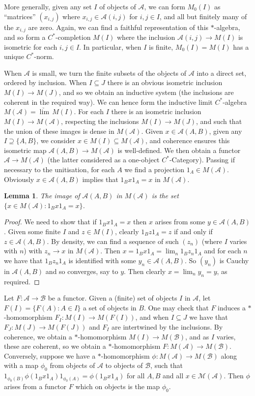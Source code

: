 \documentclass[a4paper,11pt]{article}
\theoremstyle{plain}
\newtheorem{lemma}[proposition]{Lemma}
\theoremstyle{remark}
\newcommand{\mc}[1]{\mathcal{#1}}
\begin{document}
More generally, given any set $I$ of objects of $\mc A$, we can form $M_0(I)$ as ``matrices'' $(x_{i,j})$ where $x_{i,j} \in \mc A(i,j)$ for $i,j\in I$, and all but finitely many of the $x_{i,j}$ are zero.  Again, we can find a faithful representation of this $*$-algebra, and so form a $C^*$-completion $M(I)$ where the inclusion $\mc A(i,j) \to M(I)$ is isometric for each $i,j\in I$.  In particular, when $I$ is finite, $M_0(I) = M(I)$ has a unique $C^*$-norm.

When $\mc A$ is small, we turn the finite subsets of the objects of $\mc A$ into a direct set, ordered by inclusion.  When $I\subseteq J$ there is an obvious isometric inclusion $M(I) \to M(J)$, and so we obtain an inductive system (the inclusions are coherent in the required way).  We can hence form the inductive limit $C^*$-algebra $M(\mc A) = \underrightarrow{\lim}\, M(I)$.  For each $I$ there is an isometric inclusion $M(I) \to M(\mc A)$, respecting the inclusions $M(I)\to M(J)$, and such that the union of these images is dense in $M(\mc A)$.  Given $x\in \mc A(A,B)$, given any $I \supseteq \{A,B\}$, we consider $x\in M(I) \subseteq M(\mc A)$, and coherence ensures this isometric map $\mc A(A,B) \to M(\mc A)$ is well-defined.  We then obtain a functor $\mc A \to M(\mc A)$ (the latter considered as a one-object $C^*$-Category).  Passing if necessary to the unitisation, for each $A$ we find a projection $1_A \in M(\mc A)$.  Obviously $x\in\mc A(A,B)$ implies that $1_B x 1_A = x$ in $M(\mc A)$.

\begin{lemma}
The image of $\mc A(A,B)$ in $M(\mc A)$ is the set $\{ x\in M(\mc A) : 1_B x 1_A = x \}$.
\end{lemma}
\begin{proof}
We need to show that if $1_B x 1_A = x$ then $x$ arises from some $y\in \mc A(A,B)$.  Given some finite $I$ and $z\in M(I)$, clearly $1_B z 1_A = z$ if and only if $z\in\mc A(A,B)$.  By density, we can find a sequence of such $(z_n)$ (where $I$ varies with $n$) with $z_n \to x$ in $M(\mc A)$.  Then $x = 1_B x 1_A = \lim_n 1_B z_n 1_A$ and for each $n$ we have that $1_B z_n 1_A$ is identified with some $y_n \in \mc A(A,B)$.  So $(y_n)$ is Cauchy in $\mc A(A,B)$ and so converges, say to $y$.  Then clearly $x = \lim_n y_n = y$, as required.
\end{proof}

Let $F\colon \mc A \to \mc B$ be a functor.  Given a (finite) set of objects $I$ in $\mc A$, let $F(I) = \{ F(A) : A\in I \}$ a set of objects in $B$.  One may check that $F$ induces a $*$-homomorphism $F_I \colon M(I) \to M(F(I))$, and when $I\subseteq J$ we have that $F_J \colon M(J) \to M(F(J))$ and $F_I$ are intertwined by the inclusions.  By coherence, we obtain a $*$-homomorphism $M(I) \to M(\mc B)$, and as $I$ varies, these are coherent, so we obtain a $*$-homomorphism $F \colon M(\mc A) \to M(\mc B)$.  Conversely, suppose we have a $*$-homomorphism $\phi \colon M(\mc A) \to M(\mc B)$ along with a map $\phi_0$ from objects of $\mc A$ to objects of $\mc B$, such that $1_{\phi_0(B)} \phi(1_B x 1_A) 1_{\phi_0(A)} = \phi(1_B x 1_A)$ for all $A,B$ and all $x\in\mc M(\mc A)$.  Then $\phi$ arises from a functor $F$ which on objects is the map $\phi_0$.
\end{document}
